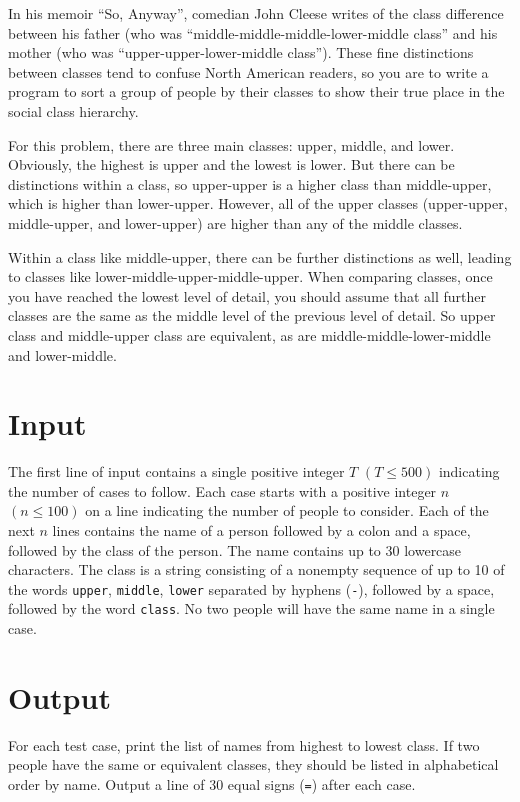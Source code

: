 
In his memoir ``So, Anyway'', comedian John Cleese writes of the class
difference between his father (who was
``middle-middle-middle-lower-middle class'' and his mother (who was
``upper-upper-lower-middle class''). These fine distinctions between
classes tend to confuse North American readers, so you are to write a
program to sort a group of people by their classes to show their true
place in the social class hierarchy.

For this problem, there are three main classes: upper, middle, and
lower. Obviously, the highest is upper and the lowest is lower. But
there can be distinctions within a class, so upper-upper is a higher
class than middle-upper, which is higher than lower-upper. However,
all of the upper classes (upper-upper, middle-upper, and lower-upper)
are higher than any of the middle classes.

Within a class like middle-upper, there can be further distinctions as
well, leading to classes like lower-middle-upper-middle-upper. When
comparing classes, once you have reached the lowest level of detail,
you should assume that all further classes are the same as the middle
level of the previous level of detail.  So upper class and
middle-upper class are equivalent, as are middle-middle-lower-middle
and lower-middle.

\section*{Input}

The first line of input contains a single positive integer $T$ $(T
\leq 500)$ indicating the number of cases to follow.  Each case starts
with a positive integer $n$ $(n \leq 100)$ on a line indicating the
number of people to consider.  Each of the next $n$ lines contains the
name of a person followed by a colon and a space, followed by the
class of the person.  The name contains up to 30 lowercase characters.
The class is a string consisting of a nonempty sequence of up to 10 of
the words \verb|upper|, \verb|middle|, \verb|lower| separated by
hyphens (\verb|-|), followed by a space, followed by the word
\verb|class|.  No two people will have the same name in a single case.

\section*{Output}
For each test case, print the list of names from highest to lowest
class.  If two people have the same or equivalent classes, they should
be listed in alphabetical order by name.  Output a line of 30 equal
signs (\verb|=|) after each case.
